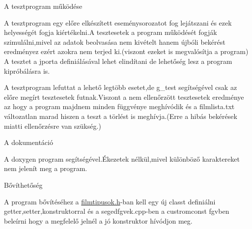 A tesztprogram működése

A tesztprogram egy előre elkészített eseménysorozatot fog lejátszani és ezek helyességét fogja kiértékelni.\+A tesztesetek a program működését fogják szimulálni,mivel az adatok beolvasása nem kivételt hanem újbóli bekérést eredményez ezért azokra nem terjed ki.(viszont ezeket is megvalósítja a program) A tesztet a jporta definiálásával lehet elindítani de lehetőség lesz a program kipróbálásra is.

A tesztprogram lefuttat a lehető legtöbb esetet,de g\+\_\+test segítségével csak az előre megírt tesztesetek futnak.\+Viszont a nem ellenőrzött tesztesetek eredménye az hogy a program majdnem minden függvénye meghívódik és a filmlista.\+txt változatlan marad hiszen a teszt a törlést is meghívja.(Erre a hibás bekérések miatti ellenőrzésre van szükség.)

A dokumentáció

A doxygen program segítségével.\+Ékezetek nélkül,mivel különböző karaktereket nem jelenít meg a program.

Bővíthetőség

A program bővítéséhez a \mbox{\hyperlink{filmtipusok_8h_source}{filmtipusok.\+h}}-\/ban kell egy új classt definiálni getter,setter,konstruktorral és a segedfgvek.\+cpp-\/ben a custromconst fgvben beleírni hogy a megfelelő jelnél a jó konstruktor hívódjon meg. 